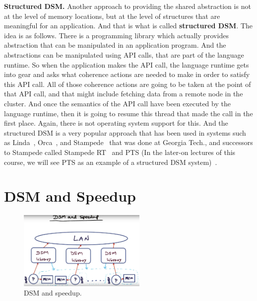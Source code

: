 \documentclass[11pt]{lecture}
\def\fullsize{0.55\textwidth}
\begin{document}
\noindent
{\bf Structured DSM.} Another approach to providing the shared abstraction is not at the level of 
memory locations, but at the level of structures that are meaningful for an application. 
And that is what is called {\bf structured DSM}. The idea is as follows. There is a programming library 
which actually provides abstraction that can be manipulated in an application program. And 
the abstractions can be manipulated using API calls, that are part of the language runtime. 
So when the application makes the API call, the language runtime gets into gear and asks what coherence actions 
are needed to make in order to satisfy this API call. All of those coherence actions are 
going to be taken at the point of that API call, and that might include fetching data from a remote 
node in the cluster. And once the semantics of the API call have been executed by the language runtime, 
then it is going to resume this thread that made the call in the first place. Again, there is not operating 
system support for this. And the structured DSM is a very popular approach that has been used 
in systems such as Linda~\cite{linda}, Orca~\cite{bal1992orca}, and Stampede~\cite{nikhil1998stampede} that was 
done at Georgia Tech., and successors to Stampede called Stampede RT~\cite{stampedert} and 
PTS (In the later-on lectures of this course, we will see PTS as an example of a structured DSM system)~\cite{Hilley2000PTS}. 

\section{DSM and Speedup}\label{sec: permance}

\begin{figure}[!htb]
\centering
\includegraphics[width=\fullsize]{Figures/performance.PNG}
\caption{DSM and speedup.}\label{fig: speedup}
\end{figure}
\end{document}
